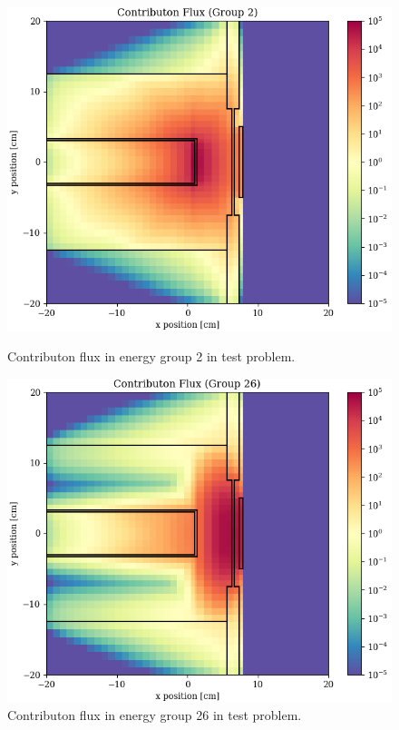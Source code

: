 \begin{figure}
  \begin{minipage}{0.49\linewidth}
    \centering
    \includegraphics[width=\linewidth]{content/testprob/scalar_flux_con_g02.png}
    \caption{Contributon flux in energy group 2 in test problem.}
    \label{fig:testprob:scalar_flux_con_g02}
  \end{minipage}
  \hfill
  \begin{minipage}{0.49\linewidth}
    \centering
    \includegraphics[width=\linewidth]{content/testprob/scalar_flux_con_g26.png}
    \caption{Contributon flux in energy group 26 in test problem.}
    \label{fig:testprob:scalar_flux_con_g26}
  \end{minipage}
\end{figure}
